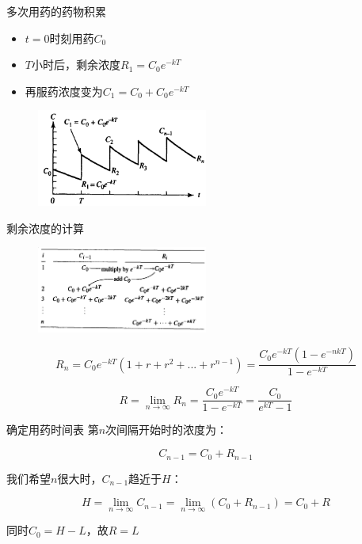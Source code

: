 \documentclass[UTF8]{ctexbeamer}
\begin{document}
\begin{frame}{多次用药的药物积累}
  \begin{itemize}
  \item $t=0$时刻用药$C_0$
  \item $T$小时后，剩余浓度$R_1 = C_0e^{-kT}$
  \item 再服药浓度变为$C_1=C_0+C_0e^{-kT}$
  \end{itemize}

  \begin{figure}
    \centering
    \includegraphics[width=0.5\textwidth]{ed.png}
  \end{figure}
  
\end{frame}

\begin{frame}{剩余浓度的计算}
  \begin{figure}
    \centering
    \includegraphics[width=0.5\textwidth]{rc.png}
  \end{figure}
  \[
  R_n = C_0e^{-kT}(1+r+r^2+...+r^{n-1}) = \frac{C_0e^{-kT}(1-e^{-nkT})}{1-e^{-kT}}
  \]

  \[
  R = \lim_{n \rightarrow \infty}R_n = \frac{C_0e^{-kT}}{1-e^{-kT}} = \frac{C_0}{e^{kT}-1}
  \]
  
\end{frame}

\begin{frame}{确定用药时间表}
  第$n$次间隔开始时的浓度为：

  \[
  C_{n-1} = C_0 + R_{n-1}
  \]
  
  我们希望$n$很大时，$C_{n-1}$趋近于$H$：
  
  \[
  H = \lim_{n \rightarrow \infty}C_{n-1} = \lim_{n \rightarrow \infty}(C_0+R_{n-1}) = C_0 + R
  \]
  
  同时$C_0 = H - L$，故$R=L$
  
\end{frame}
\end{document}
